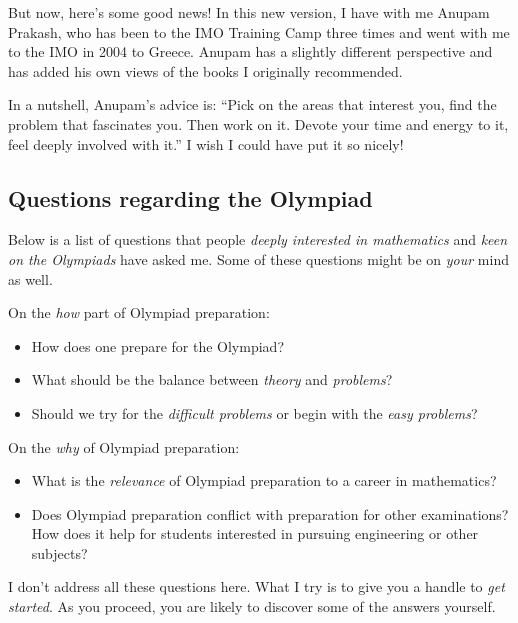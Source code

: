 \documentclass[a4paper]{amsart}
\begin{document}
But now, here's some good news! In this new version, I have with me Anupam Prakash, who has been to the IMO Training Camp three times
and went with me to the IMO in 2004 to Greece. Anupam has a slightly different perspective and has added his own views of the books
I originally recommended.

In a nutshell, Anupam's advice is: ``Pick on the areas that interest you, find the problem that fascinates you. Then work on it.
Devote your time and energy to it, feel deeply involved with it.'' I wish I could have put it so nicely!

\subsection{Questions regarding the Olympiad}

Below is a list of questions that people {\em deeply interested in mathematics} and {\em keen on the Olympiads}
have asked me. Some of these questions might be on {\em your} mind as well.

On the {\em how} part of Olympiad preparation:

\begin{itemize}

\item How does one prepare for the Olympiad?

\item What should be the balance between {\em theory} and {\em problems}?

\item Should we try for the {\em difficult problems} or begin with the {\em easy problems}?

\end{itemize}

On the {\em why} of Olympiad preparation:

\begin{itemize}

\item What is the {\em relevance} of Olympiad preparation to a career in mathematics?

\item Does Olympiad preparation conflict with preparation for other examinations? How does it help for students interested
  in pursuing engineering or other subjects?

\end{itemize}

I don't address all these questions here. What I try is to give you a handle to {\em get started}. As you proceed, you are likely
to discover some of the answers yourself.
\end{document}
